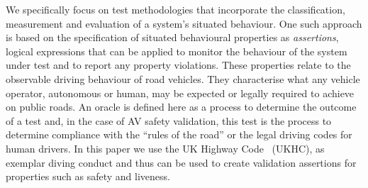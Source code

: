 We specifically focus on test methodologies that incorporate the classification, measurement and evaluation of a system's situated behaviour. One such approach is based on the specification of situated behavioural properties as \emph{assertions}, logical expressions that can be applied 
to monitor the behaviour of the system under test and to report any property violations. 
%
These properties %
relate to the observable driving behaviour of road vehicles. They characterise what any vehicle operator, autonomous or human, %
%
%
may be expected or legally required to achieve on public roads. 
%
An oracle is defined here as a process to determine the outcome of a test and, in the case of AV safety validation, this test is the process to determine compliance with the ``rules of the road'' or the legal driving codes for human drivers.
%
%
In this paper we use the UK Highway Code~\cite{highwayCode} (UKHC), as exemplar diving conduct and thus can be used to create validation assertions for properties such as safety and liveness.


